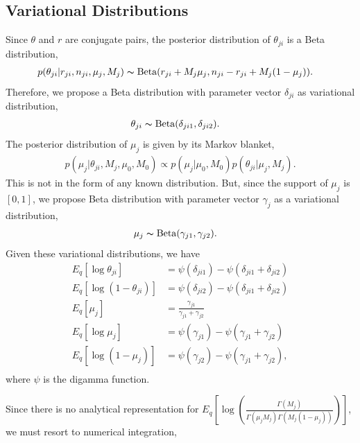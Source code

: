 \documentclass[11pt,reqno]{amsart}
\begin{document}
\subsection{Variational Distributions}
Since $\theta$ and $r$ are conjugate pairs, the posterior distribution of $\theta_{ji}$ is a Beta distribution,
\begin{align}
&p(\theta_{ji}|r_{ji},n_{ji},\mu_j,M_j)
\thicksim \text{Beta}(r_{ji}+M_j \mu_j, n_{ji}-r_{ji}+M_j(1-\mu_j)).
\end{align}
Therefore, we propose a Beta distribution with parameter vector $\delta_{ji}$ as variational distribution,
\begin{align}
\theta_{ji} &\thicksim \text{Beta}(\delta_{ji1}, \delta_{ji2}) \nonumber.
\end{align}
%
The posterior distribution of $\mu_j$ is given by its Markov blanket,
\begin{align}
p(\mu_j|\theta_{ji},M_j,\mu_0,M_0)\propto p(\mu_j|\mu_0,M_0)p(\theta_{ji}|\mu_j,M_j).
\end{align}
This is not in the form of any known distribution.
But, since the support of $\mu_j$ is $[0,1]$, we propose Beta distribution with parameter vector $\gamma_{j}$ as a variational distribution,
\begin{align}
\mu_j &\thicksim \text{Beta}(\gamma_{j1}, \gamma_{j2}) \nonumber.
\end{align}
Given these variational distributions, we have
\begin{align}
E_q \left[ \log \theta_{ji} \right] &= \psi(\delta_{ji1}) - \psi(\delta_{ji1}+\delta_{ji2}) \nonumber \\
E_q \left[ \log \left( 1 - \theta_{ji}\right) \right]&= \psi(\delta_{ji2}) - \psi(\delta_{ji1}+\delta_{ji2}) \nonumber \\
E_q \left[ \mu_j \right] &= \frac{\gamma_{j1}}{\gamma_{j1} + \gamma_{j2}} \nonumber \\
E_q  \left[ \log \mu_j \right] &= \psi(\gamma_{j1}) - \psi(\gamma_{j1}+\gamma_{j2}) \nonumber \\
E_q  \left[ \log (1 - \mu_j)\right] &= \psi(\gamma_{j2}) - \psi(\gamma_{j1}+\gamma_{j2})\nonumber, \\
\end{align}
where $\psi$ is the digamma function.

Since there is no analytical representation for $ E_q\left[ \log \left( \frac{ \Gamma(M_j) } { \Gamma(\mu_j M_j) \Gamma(M_j (1-\mu_j)) }\right)\right] $, we must resort to numerical integration,
\end{document}
